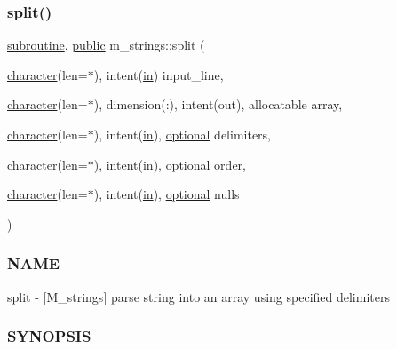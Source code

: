 \subsubsection{\texorpdfstring{split()}{split()}}
{\footnotesize\ttfamily \hyperlink{M__stopwatch_83_8txt_acfbcff50169d691ff02d4a123ed70482}{subroutine}, \hyperlink{M__stopwatch_83_8txt_a2f74811300c361e53b430611a7d1769f}{public} m\+\_\+strings\+::split (\begin{DoxyParamCaption}\item[{\hyperlink{option__stopwatch_83_8txt_abd4b21fbbd175834027b5224bfe97e66}{character}(len=$\ast$), intent(\hyperlink{M__journal_83_8txt_afce72651d1eed785a2132bee863b2f38}{in})}]{input\+\_\+line,  }\item[{\hyperlink{option__stopwatch_83_8txt_abd4b21fbbd175834027b5224bfe97e66}{character}(len=$\ast$), dimension(\+:), intent(out), allocatable}]{array,  }\item[{\hyperlink{option__stopwatch_83_8txt_abd4b21fbbd175834027b5224bfe97e66}{character}(len=$\ast$), intent(\hyperlink{M__journal_83_8txt_afce72651d1eed785a2132bee863b2f38}{in}), \hyperlink{option__stopwatch_83_8txt_aa4ece75e7acf58a4843f70fe18c3ade5}{optional}}]{delimiters,  }\item[{\hyperlink{option__stopwatch_83_8txt_abd4b21fbbd175834027b5224bfe97e66}{character}(len=$\ast$), intent(\hyperlink{M__journal_83_8txt_afce72651d1eed785a2132bee863b2f38}{in}), \hyperlink{option__stopwatch_83_8txt_aa4ece75e7acf58a4843f70fe18c3ade5}{optional}}]{order,  }\item[{\hyperlink{option__stopwatch_83_8txt_abd4b21fbbd175834027b5224bfe97e66}{character}(len=$\ast$), intent(\hyperlink{M__journal_83_8txt_afce72651d1eed785a2132bee863b2f38}{in}), \hyperlink{option__stopwatch_83_8txt_aa4ece75e7acf58a4843f70fe18c3ade5}{optional}}]{nulls }\end{DoxyParamCaption})}



\subsubsection*{N\+A\+ME}

split -\/ \mbox{[}M\+\_\+strings\mbox{]} parse string into an array using specified delimiters 

\subsubsection*{S\+Y\+N\+O\+P\+S\+IS}

